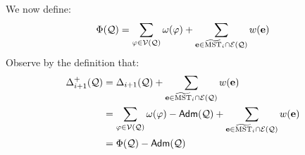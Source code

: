 We now define:
\begin{equation}\label{eq:PhiX}
	\Phi(\mathcal{Q}) = \sum_{\varphi \in \mathcal{V}(\mathcal{Q})}\omega(\varphi) + \sum_{\mathbf{e} \in \widetilde{\mathrm{MST}}_i\cap \mathcal{E}(\mathcal{Q})}w(\mathbf{e})
\end{equation}
Observe by the definition that:
\begin{equation}\label{eq:Potential-vs-Phi}
	\begin{split}
		 \Delta^+_{i+1}(\mathcal{Q}) &= \Delta_{i+1}(\mathcal{Q}) +  \sum_{\mathbf{e} \in \widetilde{\mathrm{MST}}_i\cap \mathcal{E}(\mathcal{Q})}w(\mathbf{e})\\
		&= \sum_{\varphi \in \mathcal{V}(\mathcal{Q})}\omega(\varphi) - \mathsf{Adm}(\mathcal{Q}) +  \sum_{\mathbf{e} \in \widetilde{\mathrm{MST}}_i\cap \mathcal{E}(\mathcal{Q})}w(\mathbf{e})\\
		&= \Phi(\mathcal{Q}) - 		\mathsf{Adm}(\mathcal{Q}) 
	\end{split}
\end{equation}

